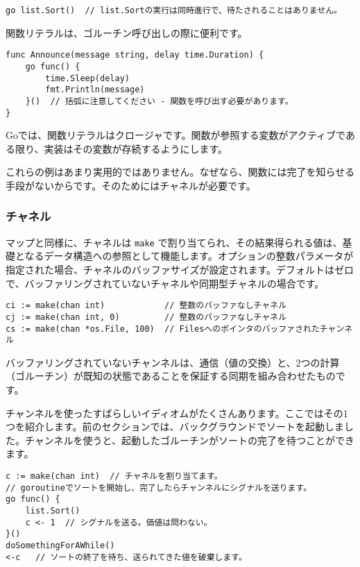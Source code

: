\documentclass{jsarticle}
\begin{document}
\begin{lstlisting}[numbers=none]
go list.Sort()  // list.Sortの実行は同時進行で、待たされることはありません。
\end{lstlisting}

関数リテラルは、ゴルーチン呼び出しの際に便利です。

\begin{lstlisting}[numbers=none]
func Announce(message string, delay time.Duration) {
    go func() {
        time.Sleep(delay)
        fmt.Println(message)
    }()  // 括弧に注意してください - 関数を呼び出す必要があります。
}
\end{lstlisting}

Goでは、関数リテラルはクロージャです。関数が参照する変数がアクティブである限り、実装はその変数が存続するようにします。

これらの例はあまり実用的ではありません。なぜなら、関数には完了を知らせる手段がないからです。そのためにはチャネルが必要です。

\subsubsection{チャネル}

マップと同様に、チャネルは \texttt{make}
で割り当てられ、その結果得られる値は、基礎となるデータ構造への参照として機能します。オプションの整数パラメータが指定された場合、チャネルのバッファサイズが設定されます。デフォルトはゼロで、バッファリングされていないチャネルや同期型チャネルの場合です。

\begin{lstlisting}[numbers=none]
ci := make(chan int)            // 整数のバッファなしチャネル
cj := make(chan int, 0)         // 整数のバッファなしチャネル
cs := make(chan *os.File, 100)  // Filesへのポインタのバッファされたチャンネル
\end{lstlisting}

バッファリングされていないチャンネルは、通信（値の交換）と、2つの計算（ゴルーチン）が既知の状態であることを保証する同期を組み合わせたものです。

チャンネルを使ったすばらしいイディオムがたくさんあります。ここではその1つを紹介します。前のセクションでは、バックグラウンドでソートを起動しました。チャンネルを使うと、起動したゴルーチンがソートの完了を待つことができます。

\begin{lstlisting}[numbers=none]
c := make(chan int)  // チャネルを割り当てます。
// goroutineでソートを開始し、完了したらチャンネルにシグナルを送ります。
go func() {
    list.Sort()
    c <- 1  // シグナルを送る。価値は問わない。
}()
doSomethingForAWhile()
<-c   // ソートの終了を待ち、送られてきた値を破棄します。
\end{lstlisting}
\end{document}
